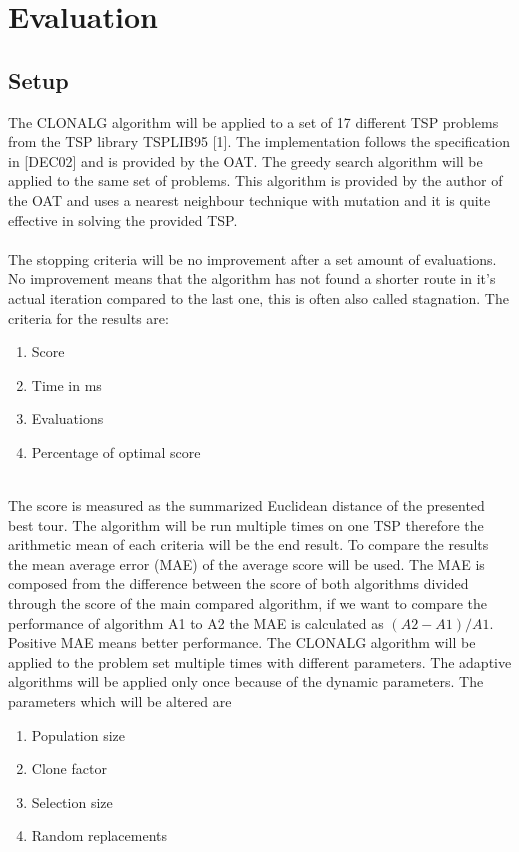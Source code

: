 \chapter{Evaluation}
\label{chap:eva}
\section{Setup}
The CLONALG algorithm will be applied to a set of 17 different TSP problems from the TSP library TSPLIB95 [1]. The implementation follows the specification in [DEC02] and is provided by the OAT. The greedy search algorithm will be applied to the same set of problems. This algorithm is provided by the author of the OAT and uses a nearest neighbour technique with mutation and it is quite effective in solving the provided TSP.\\\\ 
The stopping criteria will be no improvement after a set amount of evaluations. No improvement means that the algorithm has not found a shorter route in it's actual iteration compared to the last one, this is often also called stagnation. 
The criteria for the results are:
\begin{enumerate}
	\item 	Score
	\item 	Time in ms
	\item 	Evaluations	
	\item  	Percentage of optimal score
\end{enumerate}\\
The score is measured as the summarized Euclidean distance of the presented best tour. The algorithm will be run multiple times on one TSP therefore the arithmetic mean of each criteria will be the end result. To compare the results the mean average error (MAE) of the average score will be used. The MAE is composed from the difference between the score of both algorithms divided through the score of the main compared algorithm, if we want to compare the performance of algorithm A1 to A2 the MAE is calculated as $(A2-A1)/A1$. Positive MAE means better performance. The CLONALG algorithm will be applied to the problem set multiple times with different parameters. The adaptive algorithms will be applied only once because of the dynamic parameters.
\newpage
The parameters which will be altered are
\begin{enumerate}
	\item 	Population size
	\item 	Clone factor
	\item 	Selection size
	\item 	Random replacements	
\end{enumerate}\\
